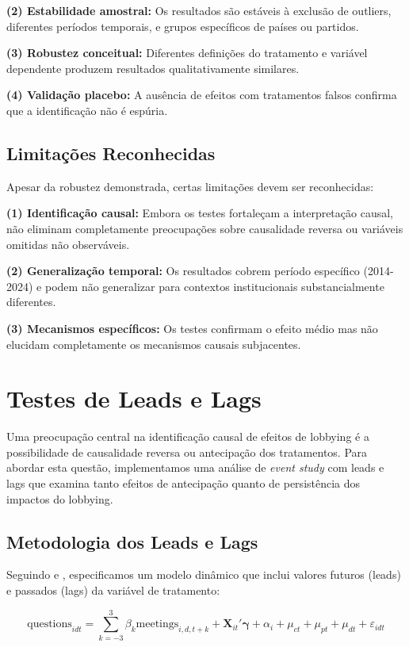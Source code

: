 \textbf{(2) Estabilidade amostral:} Os resultados são estáveis à exclusão de outliers, diferentes períodos temporais, e grupos específicos de países ou partidos.

\textbf{(3) Robustez conceitual:} Diferentes definições do tratamento e variável dependente produzem resultados qualitativamente similares.

\textbf{(4) Validação placebo:} A ausência de efeitos com tratamentos falsos confirma que a identificação não é espúria.

\subsection{Limitações Reconhecidas}

Apesar da robustez demonstrada, certas limitações devem ser reconhecidas:

\textbf{(1) Identificação causal:} Embora os testes fortaleçam a interpretação causal, não eliminam completamente preocupações sobre causalidade reversa ou variáveis omitidas não observáveis.

\textbf{(2) Generalização temporal:} Os resultados cobrem período específico (2014-2024) e podem não generalizar para contextos institucionais substancialmente diferentes.

\textbf{(3) Mecanismos específicos:} Os testes confirmam o efeito médio mas não elucidam completamente os mecanismos causais subjacentes.

\section{Testes de Leads e Lags}

Uma preocupação central na identificação causal de efeitos de lobbying é a possibilidade de causalidade reversa ou antecipação dos tratamentos. Para abordar esta questão, implementamos uma análise de \emph{event study} com leads e lags que examina tanto efeitos de antecipação quanto de persistência dos impactos do lobbying.

\subsection{Metodologia dos Leads e Lags}

Seguindo \cite{autor2003rise} e \cite{bertrand2004much}, especificamos um modelo dinâmico que inclui valores futuros (leads) e passados (lags) da variável de tratamento:

\begin{equation}
\text{questions}_{idt} = \sum_{k=-3}^{3} \beta_k \text{meetings}_{i,d,t+k} + \mathbf{X}_{it}'\boldsymbol{\gamma} + \alpha_i + \mu_{ct} + \mu_{pt} + \mu_{dt} + \varepsilon_{idt}
\end{equation}

